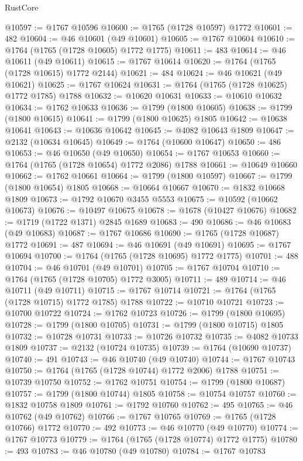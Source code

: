 \begin{lexlean}{RustCore}
\begin{coremodule}
@10597 := @1767 @10596
@10600 := @1765 (@1728 @10597) @1772
@10601 := 482
@10604 := @46 @10601 (@49 @10601)
@10605 := @1767 @10604
@10610 := @1764 (@1765 (@1728 @10605) @1772 @1775)
@10611 := 483
@10614 := @46 @10611 (@49 @10611)
@10615 := @1767 @10614
@10620 := @1764 (@1765 (@1728 @10615) @1772 @2144)
@10621 := 484
@10624 := @46 @10621 (@49 @10621)
@10625 := @1767 @10624
@10631 := @1764 (@1765 (@1728 @10625) @1772 @1785) @1788
@10632 := @10620 @10631
@10633 := @10610 @10632
@10634 := @1762 @10633
@10636 := @1799 (@1800 @10605)
@10638 := @1799 (@1800 @10615)
@10641 := @1799 (@1800 @10625) @1805
@10642 := @10638 @10641
@10643 := @10636 @10642
@10645 := @4082 @10643 @1809
@10647 := @2132 (@10634 @10645)
@10649 := @1764 (@10600 @10647)
@10650 := 486
@10653 := @46 @10650 (@49 @10650)
@10654 := @1767 @10653
@10660 := @1764 (@1765 (@1728 @10654) @1772 @2086) @1788
@10661 := @10649 @10660
@10662 := @1762 @10661
@10664 := @1799 (@1800 @10597)
@10667 := @1799 (@1800 @10654) @1805
@10668 := @10664 @10667
@10670 := @1832 @10668 @1809
@10673 := @1792 @10670 @3455 @5553
@10675 := @10592 (@10662 @10673)
@10676 := @10497 @10675
@10678 := @1678 (@10427 @10676)
@10682 := @1719 (@1722 @1371) @2845 @1689
@10683 := 490
@10686 := @46 @10683 (@49 @10683)
@10687 := @1767 @10686
@10690 := @1765 (@1728 @10687) @1772
@10691 := 487
@10694 := @46 @10691 (@49 @10691)
@10695 := @1767 @10694
@10700 := @1764 (@1765 (@1728 @10695) @1772 @1775)
@10701 := 488
@10704 := @46 @10701 (@49 @10701)
@10705 := @1767 @10704
@10710 := @1764 (@1765 (@1728 @10705) @1772 @3005)
@10711 := 489
@10714 := @46 @10711 (@49 @10711)
@10715 := @1767 @10714
@10721 := @1764 (@1765 (@1728 @10715) @1772 @1785) @1788
@10722 := @10710 @10721
@10723 := @10700 @10722
@10724 := @1762 @10723
@10726 := @1799 (@1800 @10695)
@10728 := @1799 (@1800 @10705)
@10731 := @1799 (@1800 @10715) @1805
@10732 := @10728 @10731
@10733 := @10726 @10732
@10735 := @4082 @10733 @1809
@10737 := @2132 (@10724 @10735)
@10739 := @1764 (@10690 @10737)
@10740 := 491
@10743 := @46 @10740 (@49 @10740)
@10744 := @1767 @10743
@10750 := @1764 (@1765 (@1728 @10744) @1772 @2006) @1788
@10751 := @10739 @10750
@10752 := @1762 @10751
@10754 := @1799 (@1800 @10687)
@10757 := @1799 (@1800 @10744) @1805
@10758 := @10754 @10757
@10760 := @1832 @10758 @1809
@10761 := @1792 @10760
@10762 := 495
@10765 := @46 @10762 (@49 @10762)
@10766 := @1767 @10765
@10769 := @1765 (@1728 @10766) @1772
@10770 := 492
@10773 := @46 @10770 (@49 @10770)
@10774 := @1767 @10773
@10779 := @1764 (@1765 (@1728 @10774) @1772 @1775)
@10780 := 493
@10783 := @46 @10780 (@49 @10780)
@10784 := @1767 @10783

\end{coremodule}
\end{lexlean}
